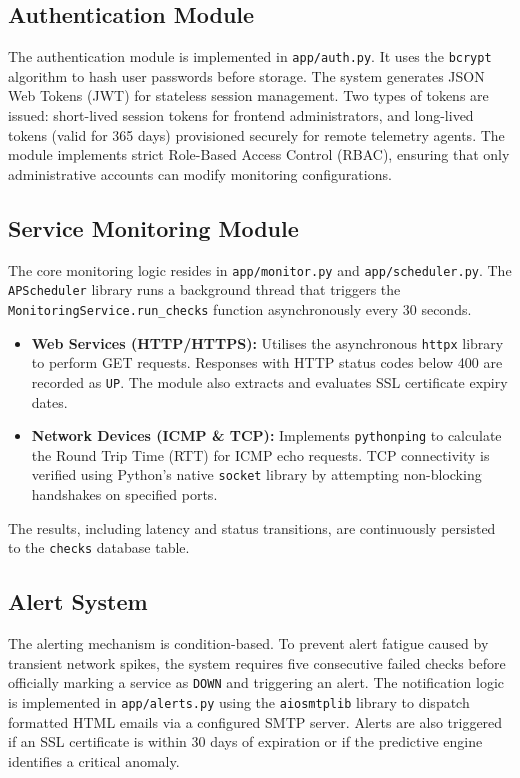 \documentclass[12pt,a4paper,oneside]{report}
\begin{document}
\subsection{Authentication Module}
\noindent The authentication module is implemented in \texttt{app/auth.py}. It uses the \texttt{bcrypt} algorithm to hash user passwords before storage. The system generates JSON Web Tokens (JWT) for stateless session management. Two types of tokens are issued: short-lived session tokens for frontend administrators, and long-lived tokens (valid for 365 days) provisioned securely for remote telemetry agents. The module implements strict Role-Based Access Control (RBAC), ensuring that only administrative accounts can modify monitoring configurations.

\subsection{Service Monitoring Module}
\noindent The core monitoring logic resides in \texttt{app/monitor.py} and \texttt{app/scheduler.py}. The \texttt{APScheduler} library runs a background thread that triggers the \texttt{MonitoringService.run\_checks} function asynchronously every 30 seconds. 
\begin{itemize}[label=\textbullet, leftmargin=*]
    \item \textbf{Web Services (HTTP/HTTPS):} Utilises the asynchronous \texttt{httpx} library to perform GET requests. Responses with HTTP status codes below 400 are recorded as \texttt{UP}. The module also extracts and evaluates SSL certificate expiry dates.
    \item \textbf{Network Devices (ICMP \& TCP):} Implements \texttt{pythonping} to calculate the Round Trip Time (RTT) for ICMP echo requests. TCP connectivity is verified using Python's native \texttt{socket} library by attempting non-blocking handshakes on specified ports.
\end{itemize}
\noindent The results, including latency and status transitions, are continuously persisted to the \texttt{checks} database table.

\subsection{Alert System}
\noindent The alerting mechanism is condition-based. To prevent alert fatigue caused by transient network spikes, the system requires five consecutive failed checks before officially marking a service as \texttt{DOWN} and triggering an alert. The notification logic is implemented in \texttt{app/alerts.py} using the \texttt{aiosmtplib} library to dispatch formatted HTML emails via a configured SMTP server. Alerts are also triggered if an SSL certificate is within 30 days of expiration or if the predictive engine identifies a critical anomaly.
\end{document}
